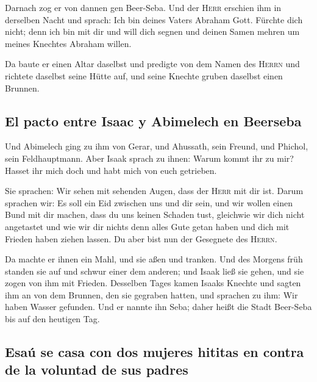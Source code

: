  Darnach zog er von dannen gen Beer-Seba. 
Und der \textsc{Herr} erschien ihm in derselben Nacht und sprach: Ich
bin deines Vaters Abraham Gott. Fürchte dich nicht; denn ich bin mit dir
und will dich segnen und deinen Samen mehren um meines Knechtes Abraham
willen.

 Da baute er einen Altar daselbst und predigte von dem
Namen des \textsc{Herrn} und richtete daselbst seine Hütte auf, und
seine Knechte gruben daselbst einen Brunnen.

\hypertarget{el-pacto-entre-isaac-y-abimelech-en-beerseba}{%
\subsection{El pacto entre Isaac y Abimelech en
Beerseba}\label{el-pacto-entre-isaac-y-abimelech-en-beerseba}}

 Und Abimelech ging zu ihm von Gerar, und Ahussath, sein
Freund, und Phichol, sein Feldhauptmann.  Aber Isaak
sprach zu ihnen: Warum kommt ihr zu mir? Hasset ihr mich doch und habt
mich von euch getrieben.

 Sie sprachen: Wir sehen mit sehenden Augen, dass der
\textsc{Herr} mit dir ist. Darum sprachen wir: Es soll ein Eid zwischen
uns und dir sein, und wir wollen einen Bund mit dir machen,
 dass du uns keinen Schaden tust, gleichwie wir dich
nicht angetastet und wie wir dir nichts denn alles Gute getan haben und
dich mit Frieden haben ziehen lassen. Du aber bist nun der Gesegnete des
\textsc{Herrn}.

 Da machte er ihnen ein Mahl, und sie aßen und tranken.
 Und des Morgens früh standen sie auf und schwur einer
dem anderen; und Isaak ließ sie gehen, und sie zogen von ihm mit
Frieden.  Desselben Tages kamen Isaaks Knechte und sagten
ihm an von dem Brunnen, den sie gegraben hatten, und sprachen zu ihm:
Wir haben Wasser gefunden.  Und er nannte ihn Seba; daher
heißt die Stadt Beer-Seba bis auf den heutigen Tag.

\hypertarget{esauxfa-se-casa-con-dos-mujeres-hititas-en-contra-de-la-voluntad-de-sus-padres}{%
\subsection{Esaú se casa con dos mujeres hititas en contra de la
voluntad de sus
padres}\label{esauxfa-se-casa-con-dos-mujeres-hititas-en-contra-de-la-voluntad-de-sus-padres}}

